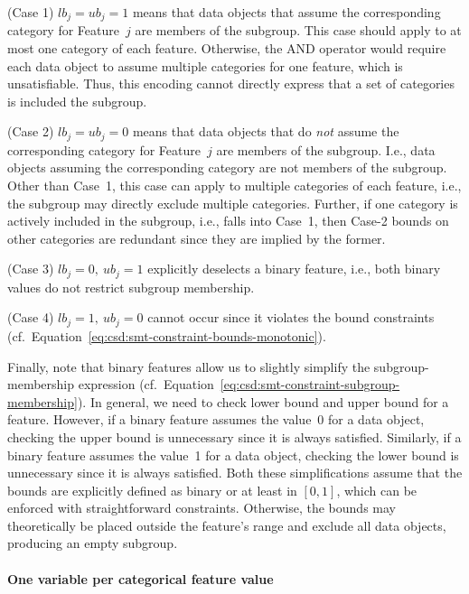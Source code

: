 \documentclass{article}
\theoremstyle{definition}
\begin{document}
(Case 1) $\mathit{lb}_j = \mathit{ub}_j = 1$ means that data objects that assume the corresponding category for Feature~$j$ are members of the subgroup.
This case should apply to at most one category of each feature.
Otherwise, the AND operator would require each data object to assume multiple categories for one feature, which is unsatisfiable.
Thus, this encoding cannot directly express that a set of categories is included the subgroup.

(Case 2) $\mathit{lb}_j = \mathit{ub}_j = 0$ means that data objects that do \emph{not} assume the corresponding category for Feature~$j$ are members of the subgroup.
I.e., data objects assuming the corresponding category are not members of the subgroup.
Other than Case~1, this case can apply to multiple categories of each feature, i.e., the subgroup may directly exclude multiple categories.
Further, if one category is actively included in the subgroup, i.e., falls into Case~1, then Case-2 bounds on other categories are redundant since they are implied by the former.

(Case 3) $\mathit{lb}_j = 0,~\mathit{ub}_j = 1$ explicitly deselects a binary feature, i.e., both binary values do not restrict subgroup membership.

(Case 4) $\mathit{lb}_j = 1,~\mathit{ub}_j = 0$ cannot occur since it violates the bound constraints (cf.~Equation~\ref{eq:csd:smt-constraint-bounds-monotonic}).

Finally, note that binary features allow us to slightly simplify the subgroup-membership expression (cf.~Equation~\ref{eq:csd:smt-constraint-subgroup-membership}).
In general, we need to check lower bound and upper bound for a feature.
However, if a binary feature assumes the value~0 for a data object, checking the upper bound is unnecessary since it is always satisfied.
Similarly, if a binary feature assumes the value~1 for a data object, checking the lower bound is unnecessary since it is always satisfied.
Both these simplifications assume that the bounds are explicitly defined as binary or at least in $[0, 1]$, which can be enforced with straightforward constraints.
Otherwise, the bounds may theoretically be placed outside the feature's range and exclude all data objects, producing an empty subgroup.

\paragraph{One variable per categorical feature value}
\end{document}

